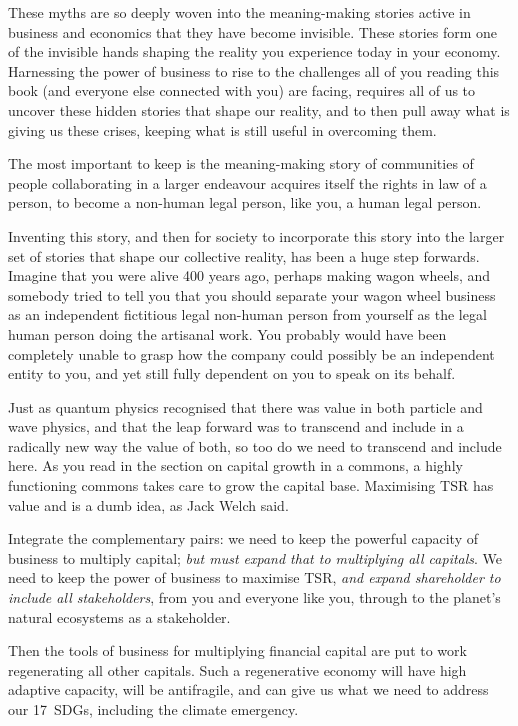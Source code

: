 These myths are so deeply woven into the meaning\hyp{}making stories active in business and economics that they have become invisible. These stories form one of the invisible hands shaping the reality you experience today in your economy. Harnessing the power of business to rise to the challenges all of you reading this book (and everyone else connected with you) are facing, requires all of us to uncover these hidden stories that shape our reality, and to then pull away what is giving us these crises, keeping what is still useful in overcoming them.


The most important to keep is the meaning\hyp{}making story of communities of people collaborating in a larger endeavour acquires itself the rights in law of a person, to become a non-human legal person, like you, a human legal person. 


Inventing this story, and then for society to incorporate this story into the larger set of stories that shape our collective reality, has been a huge step forwards. Imagine that you were alive 400 years ago, perhaps making wagon wheels, and somebody tried to tell you that you should separate your wagon wheel business as an independent fictitious legal non-human person from yourself as the legal human person doing the artisanal work. You probably would have been completely unable to grasp how the company could possibly be an independent entity to you, and yet still fully dependent on you to speak on its behalf.


Just as quantum physics recognised that there was value in both particle and wave physics, and that the leap forward was to transcend and include in a radically new way the value of both, so too do we need to transcend and include here. As you read in the section on capital growth in a commons, a highly functioning commons takes care to grow the capital base. Maximising TSR has value and is a dumb idea, as Jack Welch said.


Integrate the complementary pairs: we need to keep the powerful capacity of business to multiply capital; \emph{but must expand that to multiplying all capitals}. We need to keep the power of business to maximise TSR, \emph{and expand shareholder to include all stakeholders}, from you and everyone like you, through to the planet's natural ecosystems as a stakeholder. 


Then the tools of business for multiplying financial capital are put to work regenerating all other capitals. Such a regenerative economy will have high adaptive capacity, will be antifragile, and can give us what we need to address our 17~SDGs, including the climate emergency.


